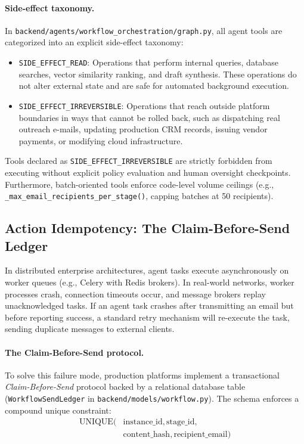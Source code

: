 \documentclass[10pt,a4paper,twocolumn]{article}
\begin{document}
\paragraph{Side-effect taxonomy.} In \texttt{backend/agents/workflow_orchestration/graph.py}, all agent tools are categorized into an explicit side-effect taxonomy:
\begin{itemize}[leftmargin=*]
  \item \texttt{SIDE\_EFFECT\_READ}: Operations that perform internal queries, database searches, vector similarity ranking, and draft synthesis. These operations do not alter external state and are safe for automated background execution.
  \item \texttt{SIDE\_EFFECT\_IRREVERSIBLE}: Operations that reach outside platform boundaries in ways that cannot be rolled back, such as dispatching real outreach e-mails, updating production CRM records, issuing vendor payments, or modifying cloud infrastructure.
\end{itemize}
Tools declared as \texttt{SIDE\_EFFECT\_IRREVERSIBLE} are strictly forbidden from executing without explicit policy evaluation and human oversight checkpoints. Furthermore, batch-oriented tools enforce code-level volume ceilings (e.g., \texttt{\_max\_email\_recipients\_per\_stage()}, capping batches at 50 recipients).

\subsection{Action Idempotency: The Claim-Before-Send Ledger}
In distributed enterprise architectures, agent tasks execute asynchronously on worker queues (e.g., Celery with Redis brokers). In real-world networks, worker processes crash, connection timeouts occur, and message brokers replay unacknowledged tasks. If an agent task crashes after transmitting an email but before reporting success, a standard retry mechanism will re-execute the task, sending duplicate messages to external clients.

\paragraph{The Claim-Before-Send protocol.} To solve this failure mode, production platforms implement a transactional \emph{Claim-Before-Send} protocol backed by a relational database table (\texttt{WorkflowSendLedger} in \texttt{backend/models/workflow.py}). The schema enforces a compound unique constraint:
\begin{equation}
\label{eq:ledger_constraint}
\begin{split}
\text{UNIQUE}(&\text{instance\_id}, \text{stage\_id}, \\
&\text{content\_hash}, \text{recipient\_email})
\end{split}
\end{equation}
\end{document}
